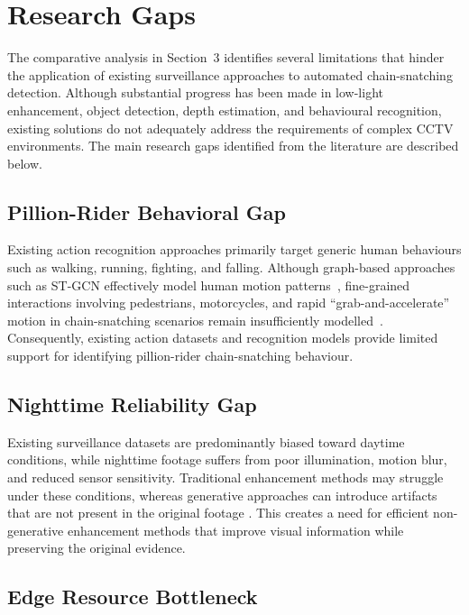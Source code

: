 \documentclass[runningheads]{llncs}
\begin{document}
\section{Research Gaps}
\label{sec:gaps}

The comparative analysis in Section~3 identifies several limitations that
hinder the application of existing surveillance approaches to automated
chain-snatching detection. Although substantial progress has been made in
low-light enhancement, object detection, depth estimation, and behavioural
recognition, existing solutions do not adequately address the requirements
of complex CCTV environments. The main research gaps identified from the
literature are described below.

\subsection{Pillion-Rider Behavioral Gap}

Existing action recognition approaches primarily target generic human
behaviours such as walking, running, fighting, and falling. Although
graph-based approaches such as ST-GCN effectively model human motion
patterns~\cite{yan2018stgcn}, fine-grained interactions involving pedestrians,
motorcycles, and rapid ``grab-and-accelerate'' motion in chain-snatching
scenarios remain insufficiently modelled~\cite{roy2018snatch}. Consequently,
existing action datasets and recognition models provide limited support for
identifying pillion-rider chain-snatching behaviour.

\subsection{Nighttime Reliability Gap}

Existing surveillance datasets are predominantly biased toward daytime
conditions, while nighttime footage suffers from poor illumination, motion
blur, and reduced sensor sensitivity. Traditional enhancement methods may
struggle under these conditions, whereas generative approaches can introduce
artifacts that are not present in the original footage
\cite{lime,enlightengan,zerodce,retinexnet}. This creates a need for
efficient non-generative enhancement methods that improve visual information
while preserving the original evidence.

\subsection{Edge Resource Bottleneck}
\end{document}
